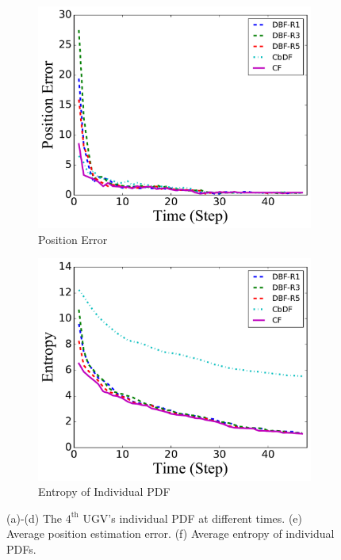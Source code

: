 \documentclass[journal]{IEEEtranTIE}
\theoremstyle{remark}
\begin{document}
\begin{figure}
\begin{subfigure}[b]{0.21\textwidth}
			\includegraphics[width=\textwidth]{hetero_mov_sen_mov_tar_pos_err_16-TIE-3798}
			\caption{Position Error}\label{fig:htr_mov_sen_mov_tar_pos_err}
		\end{subfigure}
		\begin{subfigure}[b]{0.21\textwidth}
			\includegraphics[width=\textwidth]{hetero_mov_sen_mov_tar_entropy_16-TIE-3798}
			\caption{Entropy of Individual PDF}\label{fig:htr_mov_sen_mov_tar_entropy}
		\end{subfigure}
		\caption{(a)-(d) The $4^\text{th}$ UGV's individual PDF at different times. (e) Average position estimation error. (f) Average entropy of individual PDFs.}
		\vspace{-1.2em}
	\end{figure}
	
\end{document}
